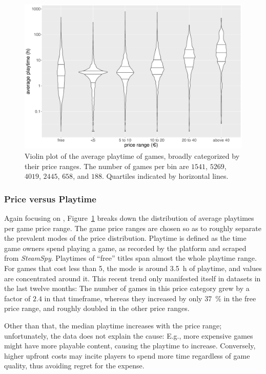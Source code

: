 \begin{figure}[!t]
	\centering
	\includegraphics[width=1.0\columnwidth]{images/steam-cost-vs-playtime-non-sale.pdf}
	\caption{Violin plot of the average playtime of \steam games, broadly categorized by their price ranges. The number of games per bin are $1541$, $5269$, $4019$, $2445$, $658$, and $188$. Quartiles indicated by horizontal lines.}
\label{fig:steam-cost-vs-playtime-violin}
\end{figure}

\subsubsection{Price versus Playtime}
Again focusing on \steam,
Figure~\ref{fig:steam-cost-vs-playtime-violin} breaks down the
distribution of average playtimes per game price range. The game price
ranges are chosen so as to roughly separate the prevalent modes of the
price distribution.
Playtime is defined as the time game owners spend playing a game, as
recorded by the \steam platform and scraped from \textit{SteamSpy}.
Playtimes of ``free'' titles 
span almost the whole playtime range.
For games that cost less than \SI{5}[\EUR]{}, the mode is around
\SI{3.5}{\hour} of playtime, and values are concentrated around it.
This recent trend only
manifested itself in datasets in the last twelve months: 
The number of games in this price category grew by a factor of
$2.4$ in that timeframe, whereas they
increased by only \SI{37}{\percent} in the free price range, and roughly doubled
in the other price ranges.

Other than that, the median playtime increases with the price range;
unfortunately, the data does not explain the cause: E.g., more expensive
games might have more playable content, causing the playtime to
increase. Conversely, higher upfront costs may incite players to spend
more time regardless of game quality, thus avoiding regret for the
expense.


